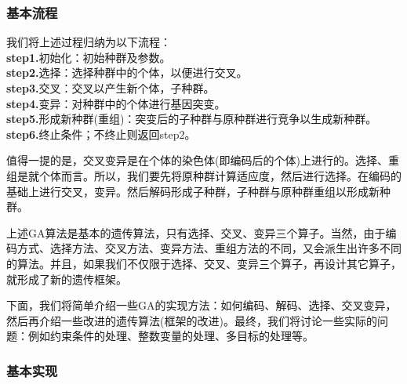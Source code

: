         \subsubsection{基本流程}
            \par
            我们将上述过程归纳为以下流程：\\
            \textbf{step1.}初始化：初始种群及参数。\\
            \textbf{step2.}选择：选择种群中的个体，以便进行交叉。\\
            \textbf{step3.}交叉：交叉以产生新个体，子种群。\\
            \textbf{step4.}变异：对种群中的个体进行基因突变。\\
            \textbf{step5.}形成新种群(重组)：突变后的子种群与原种群进行竞争以生成新种群。\\
            \textbf{step6.}终止条件；不终止则返回step2。
            \par
            值得一提的是，交叉变异是在个体的染色体(即编码后的个体)上进行的。选择、重组是就个体而言。所以，我们要先将原种群计算适应度，然后进行选择。在编码的基础上进行交叉，变异。然后解码形成子种群，子种群与原种群重组以形成新种群。
            \par
            上述GA算法是基本的遗传算法，只有选择、交叉、变异三个算子。当然，由于编码方式、选择方法、交叉方法、变异方法、重组方法的不同，又会派生出许多不同的算法。并且，如果我们不仅限于选择、交叉、变异三个算子，再设计其它算子，就形成了新的遗传框架。
            \par
            下面，我们将简单介绍一些GA的实现方法：如何编码、解码、选择、交叉变异，然后再介绍一些改进的遗传算法(框架的改进)。最终，我们将讨论一些实际的问题：例如约束条件的处理、整数变量的处理、多目标的处理等。
        \subsubsection{基本实现}

